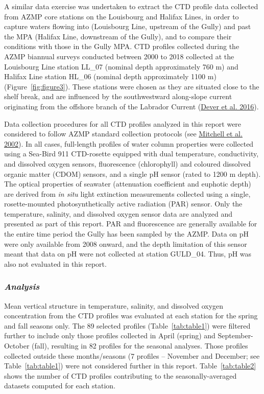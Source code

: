 \documentclass[12pt]{article}\usepackage[]{graphicx}\usepackage[]{color}
\begin{document}
A similar data exercise was undertaken to extract the CTD profile data collected from AZMP core stations on the Louisbourg and Halifax Lines, in order to capture waters flowing into (Louisbourg Line, upstream of the Gully) and past the MPA (Halifax Line, downstream of the Gully), and to compare their conditions with those in the Gully MPA. CTD profiles collected during the AZMP biannual surveys conducted between 2000 to 2018 collected at the Louisbourg Line station LL\_07 (nominal depth approximately 760 m) and Halifax Line station HL\_06 (nominal depth approximately 1100 m) (Figure~\ref{fig:figure3}). These stations were chosen as they are situated close to the shelf break, and are influenced by the southwestward along-slope current originating from the offshore branch of the Labrador Current (\protect\hyperlink{ref-dever_2016}{Dever et al. 2016}).

Data collection procedures for all CTD profiles analyzed in this report were considered to follow AZMP standard collection protocols (see \protect\hyperlink{ref-mitchell_2002}{Mitchell et al. 2002}). In all cases, full-length profiles of water column properties were collected using a Sea-Bird 911 CTD-rosette equipped with dual temperature, conductivity, and dissolved oxygen sensors, fluorescence (chlorophyll) and coloured dissolved organic matter (CDOM) sensors, and a single pH sensor (rated to 1200 m depth). The optical properties of seawater (attenuation coefficient and euphotic depth) are derived from \emph{in situ} light extinction measurements collected using a single, rosette-mounted photosynthetically active radiation (PAR) sensor. Only the temperature, salinity, and dissolved oxygen sensor data are analyzed and presented as part of this report. PAR and fluorescence are generally available for the entire time period the Gully has been sampled by the AZMP. Data on pH were only available from 2008 onward, and the depth limitation of this sensor meant that data on pH were not collected at station GULD\_04. Thus, pH was also not evaluated in this report.

\hypertarget{analysis}{%
\subsubsection{\texorpdfstring{\emph{Analysis}}{Analysis}}\label{analysis}}

Mean vertical structure in temperature, salinity, and dissolved oxygen concentration from the CTD profiles was evaluated at each station for the spring and fall seasons only. The 89 selected profiles (Table~\ref{tab:table1}) were filtered further to include only those profiles collected in April (spring) and September-October (fall), resulting in 82 profiles for the seasonal analyses. Those profiles collected outside these months/seasons (7 profiles -- November and December; see Table~\ref{tab:table1}) were not considered further in this report. Table~\ref{tab:table2} shows the number of CTD profiles contributing to the seasonally-averaged datasets computed for each station.
\end{document}
